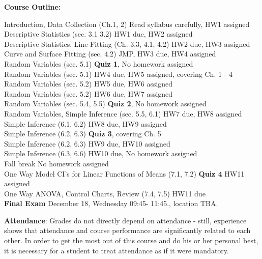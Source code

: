 \documentclass[12pt]{article}\usepackage[]{graphicx}\usepackage[]{color}
\begin{document}
\noindent\textbf{Course Outline:} 
\begin{center} \begin{minipage}{6.5in}
\begin{flushleft}
Introduction, Data Collection (Ch.1, 2) \dotfill Read syllabus carefully, HW1 assigned\\
Descriptive Statistics (sec. 3.1 3.2)  \dotfill HW1 due, HW2 assigned\\
Descriptive Statistics, Line Fitting  (Ch. 3.3, 4.1, 4.2) \dotfill HW2 due, HW3 assigned\\
Curve and Surface Fitting (sec. 4.2) \dotfill JMP, HW3 due, HW4 assigned \\
Random Variables (sec. 5.1) \dotfill \textbf{Quiz 1}, No homework assigned\\
Random Variables (sec. 5.1) \dotfill HW4 due, HW5 assigned, covering Ch. 1 - 4 \\
Random Variables (sec. 5.2) \dotfill HW5 due, HW6 assigned  \\
Random Variables (sec. 5.2) \dotfill HW6 due, HW7 assigned  \\
Random Variables (sec. 5.4, 5.5) \dotfill \textbf{Quiz 2}, No homework assigned\\
Random Variables, Simple Inference (sec. 5.5, 6.1) \dotfill HW7 due, HW8 assigned \\
Simple Inference (6.1, 6.2) \dotfill HW8 due, HW9 assigned  \\
Simple Inference (6.2, 6.3) \dotfill \textbf{Quiz 3}, covering Ch. 5 \\
Simple Inference (6.2, 6.3) \dotfill HW9 due, HW10 assigned  \\
Simple Inference (6.3, 6.6) \dotfill HW10 due, No homework assigned\\
Fall  break \dotfill No homework assigned \\
One Way Model CI's for Linear Functions of Means (7.1, 7.2) \dotfill \textbf{Quiz 4} HW11 assigned  \\
One Way ANOVA, Control Charts, Review (7.4, 7.5) \dotfill HW11 due \\
\textbf{Final Exam} \dotfill  December 18, Wednesday 09:45- 11:45., location TBA.
\end{flushleft}
\end{minipage}
\end{center}

\noindent\textbf{Attendance}:  
Grades do not directly depend on attendance - still, experience shows that attendance and course performance are significantly related to each other. In order to get the most out of this course and do his or her personal best, it is necessary for a student to treat attendance as if it were mandatory.
\end{document}
